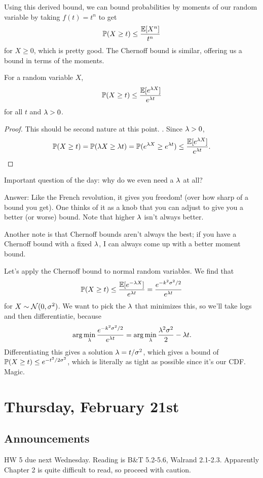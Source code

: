 \documentclass[11 pt]{scrartcl}
\begin{document}
Using this derived bound, we can bound probabilities by moments of our random variable by taking $f(t) = t^n$ to get  
    \[ \mathbb P(X \geq t) \leq \dfrac{\mathbb E[X^n]}{t^n}\] 
for $X\geq 0$, which is pretty good. The Chernoff bound is similar, offering us a bound in terms of the moments. 

\begin{theorem}
    For a random variable $X$, 
    \[ \mathbb P(X\geq t) \leq \dfrac{\mathbb E[e^{\lambda X}]}{e^{\lambda t}}\]
    for all $t$ and $\lambda > 0$.
\end{theorem}
\begin{proof}
    This should be second nature at this point. . Since $\lambda > 0$, 
    \[ \mathbb P(X\geq t) = \mathbb P(\lambda X \geq \lambda t) = \mathbb P(e^{\lambda X} \geq e^{\lambda t}) \leq \dfrac{\mathbb E[e^{\lambda X}]}{e^{\lambda t}}.\] 
\end{proof}

Important question of the day: why do we even need a $\lambda$ at all? 

Answer: Like the French revolution, it gives you freedom! (over how sharp of a bound you get). One thinks of it as a knob that you can adjust to give you a better (or worse) bound. Note that higher $\lambda$ isn't always better. 

Another note is that Chernoff bounds aren't always the best; if you have a Chernoff bound with a fixed $\lambda$, I can always come up with a better moment bound. 

\begin{example}
    Let's apply the Chernoff bound to normal random variables. We find that 
\[ \mathbb P(X\geq t) \leq \dfrac{\mathbb E[e^{-\lambda X}]}{e^{\lambda t}} = \dfrac{e^{-k^2\sigma^2/2}}{e^{\lambda t}}\] 
for $X\sim \mathcal{N}(0, \sigma^2)$. We want to pick the $\lambda$ that minimizes this, so we'll take logs and then differentiatie, because 
\[ \arg\min_\lambda \dfrac{e^{-k^2\sigma^2/2}}{e^{\lambda t}} = \arg\min_\lambda \dfrac{\lambda^2\sigma^2}{2} - \lambda t.\] 
    Differentiating this gives a solution $\lambda  = t/\sigma^2$, which gives a bound of $\mathbb P(X\geq t) \leq e^{-t^2/2\sigma^2}$, which is literally as tight as possible since it's our CDF. Magic. 
\end{example}

\newpage
\section{Thursday, February 21st}
\subsection{Announcements}
HW 5 due next Wednesday. Reading is B\&T 5.2-5.6, Walrand 2.1-2.3. Apparently Chapter 2 is quite difficult to read, so proceed with caution. %
\end{document}
